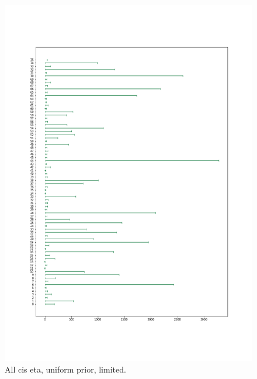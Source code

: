 \begin{figure}
    \centering
    \includegraphics[scale=0.37]{pictures/all_cis_lim_eta.png}
    \caption{All cis eta, uniform prior, limited.}
    \label{fig:all_cis_eta_lim}
\end{figure}

